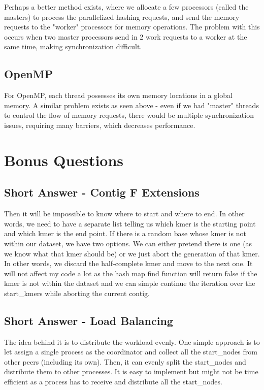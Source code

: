 \documentclass[12pt]{article}
\begin{document}
Perhaps a better method exists, where we allocate a few processors (called the masters) to process the parallelized hashing requests, and send the memory requests to the "worker" processors for memory operations. The problem with this occurs when two master processors send in 2 work requests to a worker at the same time, making synchronization difficult. 

\subsection{OpenMP} For OpenMP, each thread possesses its own memory locations in a global memory. A similar problem exists as seen above - even if we had "master" threads to control the flow of memory requests, there would be multiple synchronization issues, requiring many barriers, which decreases performance. 

\section{Bonus Questions}
\subsection{Short Answer - Contig F Extensions}
Then it will be impossible to know where to start and where to end. In other words, we need to have a separate list telling us which kmer is the starting point and which kmer is the end point. 
If there is a random base whose kmer is not within our dataset, we have two options. We can either pretend there is one (as we know what that kmer should be) or we just abort the generation of that kmer. In other words, we discard the half-complete kmer and move to the next one. It will not affect my code a lot as the hash map find function will return false if the kmer is not within the dataset and we can simple continue the iteration over the start\_kmers  while aborting the current contig.

\subsection{Short Answer - Load Balancing}
The idea behind it is to distribute the workload evenly. One simple approach is to let assign a single process as the coordinator and collect all the start\_nodes from other peers (including its own). Then, it can evenly split the start\_nodes and distribute them to other processes. It is easy to implement but might not be time efficient as a process has to receive and distribute all the start\_nodes. 
\end{document}
